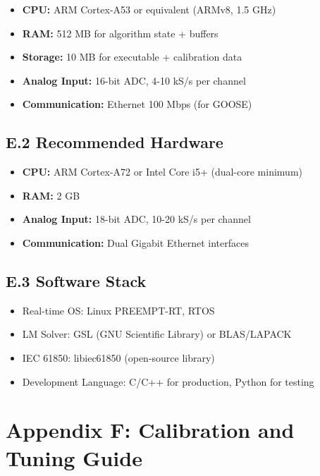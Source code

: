 \begin{itemize}
    \item \textbf{CPU:} ARM Cortex-A53 or equivalent (ARMv8, 1.5 GHz)
    \item \textbf{RAM:} 512 MB for algorithm state + buffers
    \item \textbf{Storage:} 10 MB for executable + calibration data
    \item \textbf{Analog Input:} 16-bit ADC, 4-10 kS/s per channel
    \item \textbf{Communication:} Ethernet 100 Mbps (for GOOSE)
\end{itemize}

\subsection*{E.2 Recommended Hardware}

\begin{itemize}
    \item \textbf{CPU:} ARM Cortex-A72 or Intel Core i5+ (dual-core minimum)
    \item \textbf{RAM:} 2 GB
    \item \textbf{Analog Input:} 18-bit ADC, 10-20 kS/s per channel
    \item \textbf{Communication:} Dual Gigabit Ethernet interfaces
\end{itemize}

\subsection*{E.3 Software Stack}

\begin{itemize}
    \item Real-time OS: Linux PREEMPT-RT, RTOS
    \item LM Solver: GSL (GNU Scientific Library) or BLAS/LAPACK
    \item IEC 61850: libiec61850 (open-source library)
    \item Development Language: C/C++ for production, Python for testing
\end{itemize}


\section*{Appendix F: Calibration and Tuning Guide}

